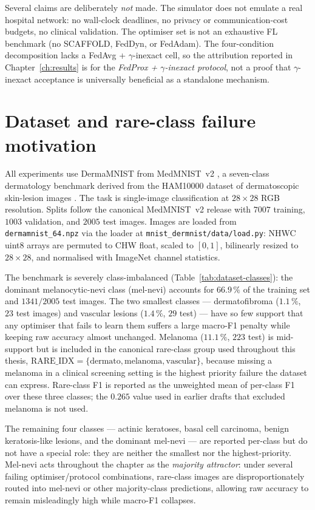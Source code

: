 \documentclass[11pt,a4paper]{report}
\begin{document}
Several claims are deliberately \emph{not} made. The simulator does
not emulate a real hospital network: no wall-clock deadlines, no
privacy or communication-cost budgets, no clinical validation. The
optimiser set is not an exhaustive FL benchmark (no SCAFFOLD, FedDyn,
or FedAdam). The four-condition decomposition lacks a FedAvg +
$\gamma$-inexact cell, so the attribution reported in
Chapter~\ref{ch:results} is for the \emph{FedProx + $\gamma$-inexact
protocol}, not a proof that $\gamma$-inexact acceptance is universally
beneficial as a standalone mechanism.

\section{Dataset and rare-class failure motivation}
\label{sec:method-dataset}

All experiments use DermaMNIST from MedMNIST~v2
\citep{yang2023medmnistv2}, a seven-class dermatology benchmark derived
from the HAM10000 dataset of dermatoscopic skin-lesion images
\citep{tschandl2018ham10000}. The task is single-image classification at
$28 \times 28$ RGB resolution. Splits follow the canonical MedMNIST~v2
release with $7007$ training, $1003$ validation, and $2005$ test images.
Images are loaded from \texttt{dermamnist\_64.npz} via the loader at
\texttt{mnist\_dermnist/data/load.py}: NHWC uint8 arrays are permuted to
CHW float, scaled to $[0, 1]$, bilinearly resized to $28 \times 28$, and
normalised with ImageNet channel statistics.

The benchmark is severely class-imbalanced (Table~\ref{tab:dataset-classes}):
the dominant melanocytic-nevi class (mel-nevi) accounts for
$66.9\,\%$ of the training set and $1341 / 2005$ test images. The two
smallest classes --- dermatofibroma ($1.1\,\%$, $23$ test images) and
vascular lesions ($1.4\,\%$, $29$ test) --- have so few support that any
optimiser that fails to learn them suffers a large macro-F1 penalty
while keeping raw accuracy almost unchanged. Melanoma ($11.1\,\%$,
$223$ test) is mid-support but is included in the canonical rare-class
group used throughout this thesis,
$\mathrm{RARE\_IDX} = \{\text{dermato}, \text{melanoma}, \text{vascular}\}$,
because missing a melanoma in a clinical screening setting is the highest
priority failure the dataset can express. Rare-class F1 is reported as
the unweighted mean of per-class F1 over these three classes; the
$0.265$ value used in earlier drafts that excluded melanoma is not used.

The remaining four classes --- actinic keratoses, basal cell carcinoma,
benign keratosis-like lesions, and the dominant mel-nevi --- are reported
per-class but do not have a special role: they are neither the smallest
nor the highest-priority. Mel-nevi acts throughout the chapter as the
\emph{majority attractor}: under several failing optimiser/protocol
combinations, rare-class images are disproportionately routed into
mel-nevi or other majority-class predictions, allowing raw accuracy
to remain misleadingly high while macro-F1 collapses.
\end{document}
